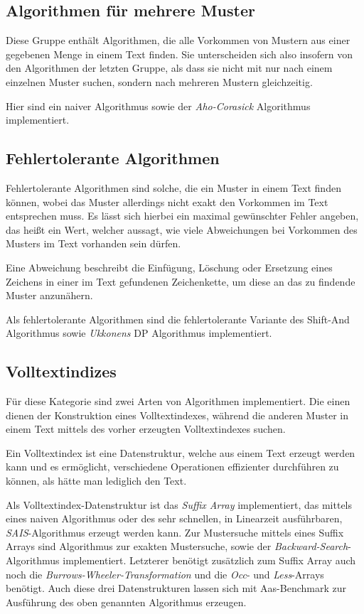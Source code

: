 \documentclass[twocolumn]{article}
\begin{document}
\subsection{Algorithmen für mehrere Muster}

Diese Gruppe enthält Algorithmen, die alle Vorkommen von Mustern aus einer gegebenen Menge in einem Text finden. Sie unterscheiden sich also insofern von den Algorithmen der letzten Gruppe, als dass sie nicht mit nur nach einem einzelnen Muster suchen, sondern nach mehreren Mustern gleichzeitig.

Hier sind ein naiver Algorithmus sowie der \textit{Aho-Corasick} Algorithmus implementiert.

\subsection{Fehlertolerante Algorithmen}

Fehlertolerante Algorithmen sind solche, die ein Muster in einem Text finden können, wobei das Muster allerdings nicht exakt den Vorkommen im Text entsprechen muss. Es lässt sich hierbei ein maximal gewünschter Fehler angeben, das heißt ein Wert, welcher aussagt, wie viele Abweichungen bei Vorkommen des Musters im Text vorhanden sein dürfen.

Eine Abweichung beschreibt die Einfügung, Löschung oder Ersetzung eines Zeichens in einer im Text gefundenen Zeichenkette, um diese an das zu findende Muster anzunähern.

Als fehlertolerante Algorithmen sind die fehlertolerante Variante des Shift-And Algorithmus sowie \textit{Ukkonens} DP Algorithmus implementiert.

\subsection{Volltextindizes}

Für diese Kategorie sind zwei Arten von Algorithmen implementiert. Die einen dienen der Konstruktion eines Volltextindexes, während die anderen Muster in einem Text mittels des vorher erzeugten Volltextindexes suchen.

Ein Volltextindex ist eine Datenstruktur, welche aus einem Text erzeugt werden kann und es ermöglicht, verschiedene Operationen effizienter durchführen zu können, als hätte man lediglich den Text.

Als Volltextindex-Datenstruktur ist das \textit{Suffix Array} implementiert, das mittels eines naiven Algorithmus oder des sehr schnellen, in Linearzeit ausführbaren, \textit{SAIS}-Algorithmus erzeugt werden kann. Zur Mustersuche mittels eines Suffix Arrays sind Algorithmus zur exakten Mustersuche, sowie der \textit{Backward-Search}-Algorithmus implementiert. Letzterer benötigt zusätzlich zum Suffix Array auch noch die \textit{Burrows-Wheeler-Transformation} und die \textit{Occ}- und \textit{Less}-Arrays benötigt. Auch diese drei Datenstrukturen lassen sich mit Aas-Benchmark zur Ausführung des oben genannten Algorithmus erzeugen.
\end{document}
